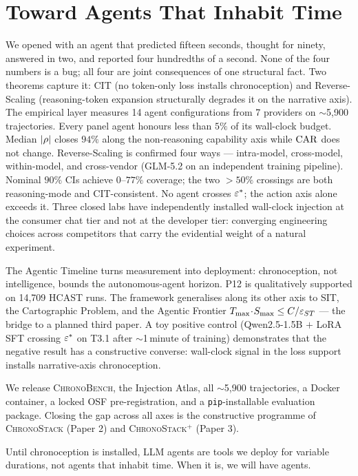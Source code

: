
\section{Toward Agents That Inhabit Time}
\label{sec:conclusion}

We opened with an agent that predicted fifteen seconds, thought for ninety, answered in two, and reported four hundredths of a second. None of the four numbers is a bug; all four are joint consequences of one structural fact. Two theorems capture it: CIT (no token-only loss installs chronoception) and Reverse-Scaling (reasoning-token expansion structurally degrades it on the narrative axis). The empirical layer measures 14 agent configurations from 7 providers on $\sim$5{,}900 trajectories. Every panel agent honours less than $5\%$ of its wall-clock budget. Median $|\rho|$ closes $94\%$ along the non-reasoning capability axis while $\mathrm{CAR}$ does not change. Reverse-Scaling is confirmed four ways --- intra-model, cross-model, within-model, and cross-vendor (GLM-5.2 on an independent training pipeline). Nominal $90\%$ CIs achieve $0$--$77\%$ coverage; the two $> 50\%$ crossings are both reasoning-mode and CIT-consistent. No agent crosses $\varepsilon^{*}$; the action axis alone exceeds it. Three closed labs have independently installed wall-clock injection at the consumer chat tier and not at the developer tier: converging engineering choices across competitors that carry the evidential weight of a natural experiment.

The Agentic Timeline turns measurement into deployment: chronoception, not intelligence, bounds the autonomous-agent horizon. P12 is qualitatively supported on 14{,}709 HCAST runs. The framework generalises along its other axis to SIT, the Cartographic Problem, and the Agentic Frontier $T_{\max}\!\cdot\!S_{\max} \leq C/\varepsilon_{ST}$ --- the bridge to a planned third paper. A toy positive control (Qwen2.5-1.5B $+$ LoRA SFT crossing $\varepsilon^{*}$ on T3.1 after $\sim$1\,minute of training) demonstrates that the negative result has a constructive converse: wall-clock signal in the loss support installs narrative-axis chronoception.

We release \textsc{ChronoBench}, the Injection Atlas, all $\sim$5{,}900 trajectories, a Docker container, a locked OSF pre-registration, and a \texttt{pip}-installable evaluation package. Closing the gap across all axes is the constructive programme of \textsc{ChronoStack} (Paper 2) and \textsc{ChronoStack}$^{+}$ (Paper 3).

Until chronoception is installed, LLM agents are tools we deploy for variable durations, not agents that inhabit time. When it is, we will have agents.
